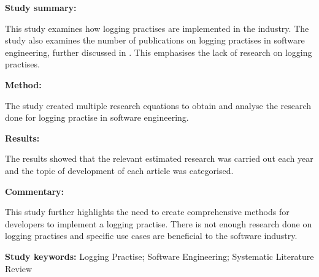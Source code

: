 \begin{tcolorbox}[colback=gray!5!white, colframe=pastelgreen!40!black, title=A Systematic Review of Logging Practice in Software Engineering\cite{Rong2018}]
	\begin{minipage}[t]{0.25\textwidth}
		\textbf{Study summary:}
	\end{minipage}
	\hfill
	\begin{minipage}[t]{0.65\textwidth}
		This study examines how logging practises are implemented in the industry. The study also
examines the number of publications on logging practises in software engineering, further
discussed in . This emphasises the lack of research on logging practises.
	\end{minipage}

	\vspace{0.75em} 

	\begin{minipage}[t]{0.25\textwidth}
		\textbf{Method:}
	\end{minipage}
	\hfill
	\begin{minipage}[t]{0.65\textwidth}
		The study created multiple research equations to obtain and analyse the research done for logging practise in software engineering.
	\end{minipage}

	\vspace{0.75em} 

	\begin{minipage}[t]{0.25\textwidth}
		\textbf{Results:}
	\end{minipage}
	\hfill
	\begin{minipage}[t]{0.65\textwidth}
		The results showed that the relevant estimated research was carried out each year and the topic of development of each article was categorised.
	\end{minipage}

	\vspace{0.75em} 

	\begin{minipage}[t]{0.25\textwidth}
		\textbf{Commentary:}
	\end{minipage}
	\hfill
	\begin{minipage}[t]{0.65\textwidth}
		This study further highlights the need to create comprehensive methods for developers to
implement a logging practise. There is not enough research done on logging practises and
specific use cases are beneficial to the software industry. 
	\end{minipage}
	\tcblower
	\textbf{Study keywords:} Logging Practise; Software Engineering; Systematic Literature Review
\end{tcolorbox}


